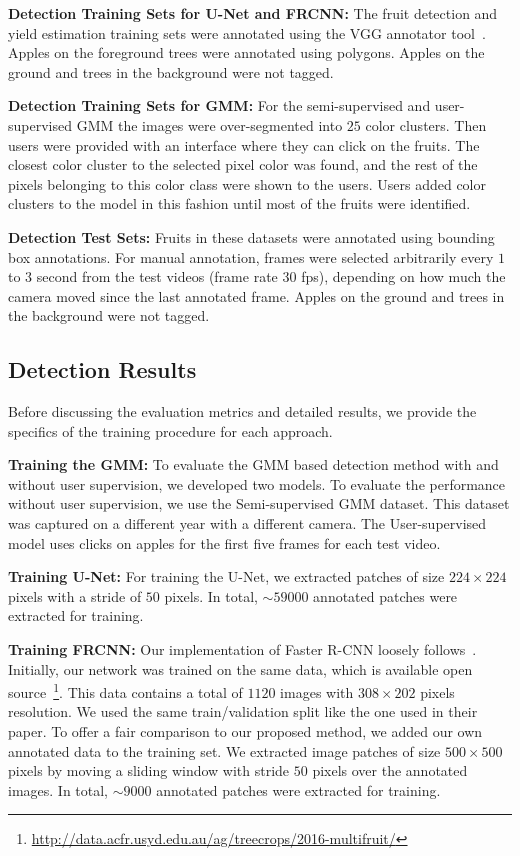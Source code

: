 \textbf{Detection Training Sets for U-Net and FRCNN:} The fruit detection and yield estimation training sets were annotated using the VGG annotator tool~\cite{dutta_vgg_2016}. Apples on the foreground trees were annotated using polygons. Apples on the ground and trees in the background were not tagged.

\textbf{Detection Training Sets for GMM:} For the semi-supervised and user-supervised GMM the images were over-segmented into $25$ color clusters. Then users were provided with an interface where they can click on the fruits. The closest color cluster to the selected pixel color was found, and the rest of the pixels belonging to this color class were shown to the users. Users added color clusters to the model in this fashion until most of the fruits were identified.

\textbf{Detection Test Sets:} Fruits in these datasets were annotated using bounding box annotations. For manual annotation, frames were selected arbitrarily every $1$ to $3$ second from the test videos (frame rate 30 fps), depending on how much the camera moved since the last annotated frame. Apples on the ground and trees in the background were not tagged.



\subsection{Detection Results}\label{subsec:detection_result}
Before discussing the evaluation metrics and detailed results, we provide the specifics of the training procedure for each approach.

\textbf{Training the GMM:} To evaluate the GMM based detection method with and without user supervision, we developed two models. To evaluate the performance without user supervision, we use the Semi-supervised GMM dataset. This dataset was captured on a different year with a different camera. The User-supervised model uses clicks on apples for the first five frames for each test video.

\textbf{Training U-Net:} For training the U-Net, we extracted patches of size $224 \times 224$ pixels with a stride of $50$ pixels. In total, $\sim 59000$ annotated patches were extracted for training.

\textbf{Training FRCNN:} Our implementation of Faster R-CNN loosely follows~\cite{bargoti_deep_2017}. Initially, our network was trained on the same data, which is available open source~\footnote{\url{http://data.acfr.usyd.edu.au/ag/treecrops/2016-multifruit/}}. This data contains a total of $1120$ images with $308 \times 202$ pixels resolution. We used the same train/validation split like the one used in their paper. To offer a fair comparison to our proposed method, we added our own annotated data to the training set. We extracted image patches of size $500 \times 500$ pixels by moving a sliding window with stride $50$ pixels over the annotated images. In total, $\sim 9000$ annotated patches were extracted for training.

